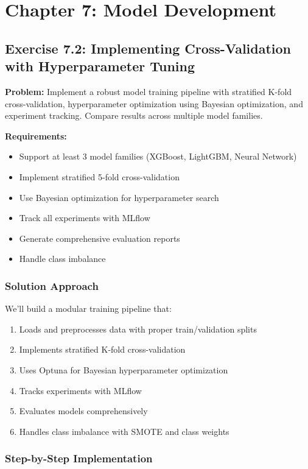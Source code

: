\section{Chapter 7: Model Development}

\subsection{Exercise 7.2: Implementing Cross-Validation with Hyperparameter Tuning}

\textbf{Problem:} Implement a robust model training pipeline with stratified K-fold cross-validation, hyperparameter optimization using Bayesian optimization, and experiment tracking. Compare results across multiple model families.

\textbf{Requirements:}
\begin{itemize}
    \item Support at least 3 model families (XGBoost, LightGBM, Neural Network)
    \item Implement stratified 5-fold cross-validation
    \item Use Bayesian optimization for hyperparameter search
    \item Track all experiments with MLflow
    \item Generate comprehensive evaluation reports
    \item Handle class imbalance
\end{itemize}

\subsubsection{Solution Approach}

We'll build a modular training pipeline that:
\begin{enumerate}
    \item Loads and preprocesses data with proper train/validation splits
    \item Implements stratified K-fold cross-validation
    \item Uses Optuna for Bayesian hyperparameter optimization
    \item Tracks experiments with MLflow
    \item Evaluates models comprehensively
    \item Handles class imbalance with SMOTE and class weights
\end{enumerate}

\subsubsection{Step-by-Step Implementation}

